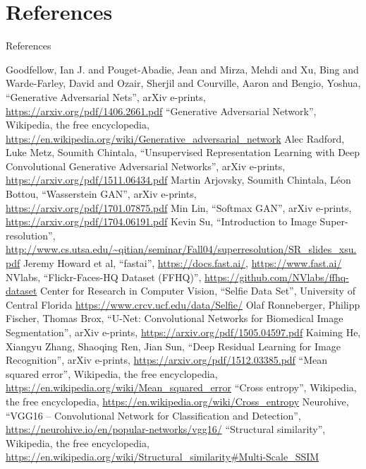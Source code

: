\documentclass{beamer}
\begin{document}
\section{References}
	\begin{frame}[allowframebreaks]{References}
		
		\begin{thebibliography}{30}
		 {Goodfellow}, Ian J. and {Pouget-Abadie}, Jean and {Mirza}, Mehdi and {Xu}, Bing and {Warde-Farley}, David and {Ozair}, Sherjil and {Courville}, Aaron and {Bengio}, Yoshua, ``Generative Adversarial Nets'', arXiv e-prints, \url{https://arxiv.org/pdf/1406.2661.pdf}
		 ``Generative Adversarial Network'', Wikipedia, the free encyclopedia, \url{https://en.wikipedia.org/wiki/Generative\_adversarial\_network}
		 Alec Radford, Luke Metz, Soumith Chintala, ``Unsupervised Representation Learning with Deep Convolutional Generative Adversarial Networks'', arXiv e-prints, \url{https://arxiv.org/pdf/1511.06434.pdf}
		 Martin Arjovsky, Soumith Chintala, Léon Bottou, ``Wasserstein GAN'', arXiv e-prints, \url{https://arxiv.org/pdf/1701.07875.pdf}
		 Min Lin, ``Softmax GAN'', arXiv e-prints, \url{https://arxiv.org/pdf/1704.06191.pdf}
		  Kevin Su, ``Introduction to Image Super-resolution'', \url{http://www.cs.utsa.edu/~qitian/seminar/Fall04/superresolution/SR_slides_xsu.pdf} 
		 Jeremy Howard et al, ``fastai'', \url{https://docs.fast.ai/}, \url{https://www.fast.ai/}
		 NVlabs, ``Flickr-Faces-HQ Dataset (FFHQ)'', \url{https://github.com/NVlabs/ffhq-dataset}
		 Center for Research in Computer Vision, ``Selfie Data Set'', University of Central Florida \url{https://www.crcv.ucf.edu/data/Selfie/}
		 Olaf Ronneberger, Philipp Fischer, Thomas Brox, ``U-Net: Convolutional Networks for Biomedical Image Segmentation'', arXiv e-prints, \url{https://arxiv.org/pdf/1505.04597.pdf}
		 Kaiming He, Xiangyu Zhang, Shaoqing Ren, Jian Sun, ``Deep Residual Learning for Image Recognition'', arXiv e-prints,  \url{https://arxiv.org/pdf/1512.03385.pdf}
		 ``Mean squared error'', Wikipedia, the free encyclopedia, \url{https://en.wikipedia.org/wiki/Mean_squared_error}
		 ``Cross entropy'', Wikipedia, the free encyclopedia, \url{https://en.wikipedia.org/wiki/Cross_entropy}
		 Neurohive, ``VGG16 – Convolutional Network for Classification and Detection'', \url{https://neurohive.io/en/popular-networks/vgg16/}
		 ``Structural similarity'', Wikipedia, the free encyclopedia, \url{https://en.wikipedia.org/wiki/Structural_similarity#Multi-Scale_SSIM}

\end{thebibliography}
\end{frame}
\end{document}
